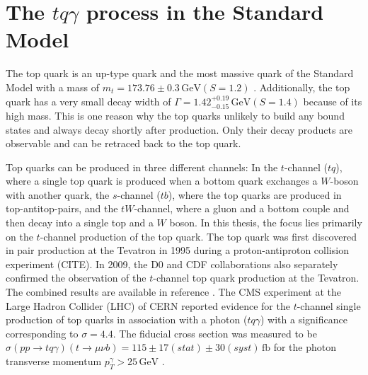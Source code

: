 \section{The \texorpdfstring{$tq\gamma$}{tqGamma} process in the Standard Model}
\label{sec:tqgammainsm}

The top quark is an up-type quark and the most massive quark of the Standard Model with a mass of $m_t = 173.76 \pm 0.3 \,\si{\giga\electronvolt} (S =1.2)$ \cite{pdg}. Additionally, the top quark has a very small decay width of $\Gamma = 1.42^{+0.19}_{-0.15} \,\si{\giga\electronvolt} (S=1.4)$ \cite{pdg} because of its high mass.
This is one reason why the top quarks unlikely to build any bound states and always decay shortly after production. Only their decay products are observable and can be retraced back to the top quark. 

Top quarks can be produced in three different channels: In the $t$-channel ($tq$), where a single top quark is produced when a bottom quark exchanges a $W$-boson with another quark, the $s$-channel ($tb$), where the top quarks are produced in top-antitop-pairs, and the $tW$-channel, where a gluon and a bottom couple and then decay into a single top and a $W$ boson. In this thesis, the focus lies primarily on the $t$-channel production of the top quark. 
The top quark was first discovered in pair production at the Tevatron in 1995 during a proton-antiproton collision experiment (CITE). In 2009, the D0 \cite{singletop1} and CDF \cite{singletop2} collaborations also separately confirmed the observation of the $t$-channel top quark production at the Tevatron. The combined results are available in reference \cite{singletop3}. 
The CMS experiment at the Large Hadron Collider (LHC) of CERN \cite{CMS} reported evidence for the $t$-channel single production of top quarks in association with a photon ($tq\gamma$) with a significance corresponding to $\sigma = 4.4$. The fiducial cross section 
was measured to be $\sigma(pp\rightarrow tq\gamma)(t\rightarrow\mu \nu b) = 115 \pm 17 (stat) \pm 30 (syst) \,\si{\femto\barn}$ for the photon transverse momentum $p_T^\gamma > 25 \,\si{\giga\electronvolt}$ \cite{evidenceCMS}. 

